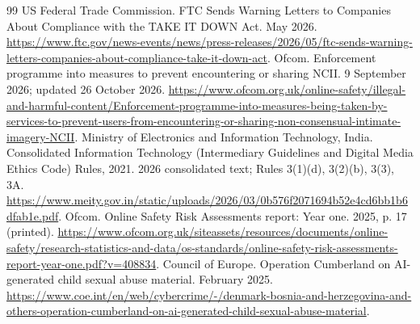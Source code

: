 \documentclass[10pt,a4paper]{article}
\begin{document}
\begin{thebibliography}{99}
 US Federal Trade Commission. FTC Sends Warning Letters to Companies About Compliance with the TAKE IT DOWN Act. May 2026. \url{https://www.ftc.gov/news-events/news/press-releases/2026/05/ftc-sends-warning-letters-companies-about-compliance-take-it-down-act}.
 Ofcom. Enforcement programme into measures to prevent encountering or sharing NCII. 9 September 2026; updated 26 October 2026. \url{https://www.ofcom.org.uk/online-safety/illegal-and-harmful-content/Enforcement-programme-into-measures-being-taken-by-services-to-prevent-users-from-encountering-or-sharing-non-consensual-intimate-imagery-NCII}.
 Ministry of Electronics and Information Technology, India. Consolidated Information Technology (Intermediary Guidelines and Digital Media Ethics Code) Rules, 2021. 2026 consolidated text; Rules 3(1)(d), 3(2)(b), 3(3), 3A. \url{https://www.meity.gov.in/static/uploads/2026/03/0b576f2071694b52e4cd6bb1b6dfab1e.pdf}.
 Ofcom. Online Safety Risk Assessments report: Year one. 2025, p. 17 (printed). \url{https://www.ofcom.org.uk/siteassets/resources/documents/online-safety/research-statistics-and-data/os-standards/online-safety-risk-assessments-report-year-one.pdf?v=408834}.
 Council of Europe. Operation Cumberland on AI-generated child sexual abuse material. February 2025. \url{https://www.coe.int/en/web/cybercrime/-/denmark-bosnia-and-herzegovina-and-others-operation-cumberland-on-ai-generated-child-sexual-abuse-material}.
\end{thebibliography}
\end{document}
